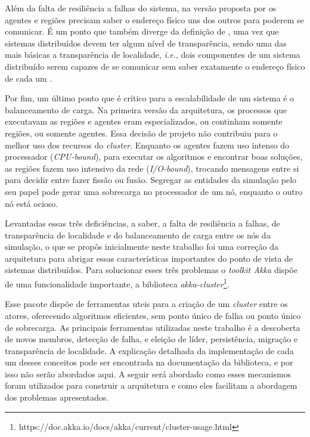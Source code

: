 Além da falta de resiliência a falhas do sistema, na versão proposta por  os agentes e regiões precisam saber o endereço físico uns dos outros para poderem se comunicar. É um ponto que também diverge da definição de , uma vez que sistemas distribuídos devem ter algum nível de transparência, sendo uma das mais básicas a transparência de localidade, \textit{i.e.}, dois componentes de um sistema distribuído serem capazes de se comunicar sem saber exatamente o endereço físico de cada um \cite[p.4]{tanenbaum}.

Por fim, um último ponto que é crítico para a escalabilidade de um sistema é o balanceamento de carga. Na primeira versão 
 da arquitetura, os processos que executavam as regiões e agentes eram especializados, ou continham somente regiões, ou somente agentes. Essa decisão de projeto não contribuiu para o melhor uso dos recursos do \textit{cluster}. Enquanto os agentes fazem uso intenso do processador (\textit{CPU-bound}), para executar os algoritmos e encontrar boas soluções, as regiões fazem uso intensivo da rede (\textit{I/O-bound}), trocando mensagens entre si para decidir entre fazer fissão ou fusão. Segregar as entidades da simulação pelo seu papel pode gerar uma sobrecarga no processador de um nó, enquanto o outro nó está ocioso.
 
 Levantadas essas três deficiências, a saber, a falta de resiliência a falhas, de transparência de localidade e do balanceamento de carga entre os nós da simulação, o que se propôs inicialmente neste trabalho foi uma correção da arquitetura para abrigar essas características importantes do ponto de vista de sistemas distribuídos. Para solucionar esses três problemas o \textit{toolkit Akka} dispõe de uma funcionalidade importante, a biblioteca \textit{akka-cluster}\footnote{https://doc.akka.io/docs/akka/current/cluster-usage.html}. 
 
 Esse pacote dispõe de ferramentas uteis para a criação de um \textit{cluster} entre os atores, oferecendo algoritmos eficientes, sem ponto único de falha ou ponto único de sobrecarga. As principais ferramentas utilizadas neste trabalho é a descoberta de novos membros, detecção de falha, e eleição de líder, persistência, migração e transparência de localidade. A explicação detalhada da implementação de cada um desses conceitos pode ser encontrada na documentação da biblioteca, e por isso não serão abordados aqui. A seguir será abordado como esses mecanismos foram utilizados para construir a arquitetura e como eles facilitam a abordagem dos problemas apresentados.
 
